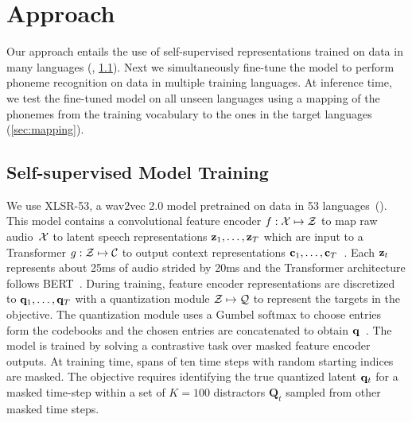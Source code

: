 \documentclass{article}
\begin{document}
\section{Approach}
\label{sec:approach}

Our approach entails the use of self-supervised representations trained on data in many languages (\cite{conneau2020unsupervised}, \textsection\ref{sec:w2v}).
Next we simultaneously fine-tune the model to perform phoneme recognition on data in multiple training languages.
At inference time, we test the fine-tuned model on all unseen languages using a mapping of the phonemes from the training vocabulary to the ones in the target languages (\textsection\ref{sec:mapping}).


\subsection{Self-supervised Model Training}
\label{sec:w2v}

We use XLSR-53, a wav2vec 2.0 model pretrained on data in 53 languages~(\cite{conneau2020unsupervised,baevski2020wav2vec}). 
This model contains a convolutional feature encoder $f: \mathcal{X} \mapsto \mathcal{Z}$ to map raw audio~$\mathcal{X}$ to latent speech representations $\mathbf{z}_1, \dots, \mathbf{z}_T$ which are input to a Transformer $g: \mathcal{Z} \mapsto \mathcal{C}$ to output context representations $\mathbf{c}_1, \dots, \mathbf{c}_T$~\cite{devlin2018bert,baevski2019vqwav2vec}.
Each $\mathbf{z}_t$ represents about 25ms of audio strided by 20ms and the Transformer architecture follows BERT~\cite{vaswani2017transformer,devlin2018bert}.
During training, feature encoder representations are discretized to $\mathbf{q}_1, \dots, \mathbf{q}_T$ with a quantization module $\mathcal{Z} \mapsto \mathcal{Q}$ to represent the targets in the objective.
The quantization module uses a Gumbel softmax to choose entries form the codebooks and the chosen entries are concatenated to obtain $\mathbf{q}$~\cite{jegou2011ieee,jang2016gumbel,baevski2019vqwav2vec}.
The model is trained by solving a contrastive task over masked feature encoder outputs.
At training time, spans of ten time steps with random starting indices are masked.
The objective requires identifying the true quantized latent $\mathbf{q}_t$ for a masked time-step within a set of $K=100$ distractors $\mathbf{Q}_t$ sampled from other masked time steps.
\end{document}
